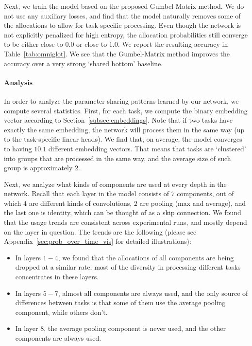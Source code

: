 \documentclass[conference]{IEEEtran}
\begin{document}
Next, we train the model based on the proposed Gumbel-Matrix method. We do not use any auxiliary losses, and find that the model naturally removes some of the allocations to allow for task-specific processing. Even though the network is not explicitly penalized for high entropy, the allocation probabilities still converge to be either close to $0.0$ or close to $1.0$. We report the resulting accuracy in Table~\ref{tab:omniglot}. We see that the Gumbel-Matrix method improves the accuracy over a very strong `shared bottom' baseline.

\paragraph{Analysis}

In order to analyze the parameter sharing patterns learned by our network, we compute several statistics. First, for each task, we compute the binary embedding vector according to Section~\ref{subsec:embeddings}. Note that if two tasks have exactly the same embedding, the network will process them in the same way (up to the task-specific linear heads). We find that, on average, the model converges to having $10.1$ different embedding vectors. That means that tasks are `clustered' into groups that are processed in the same way, and the average size of such group is approximately $2$.

Next, we analyze what kinds of components are used at every depth in the network. Recall that each layer in the model consists of $7$ components, out of which $4$ are different kinds of convolutions, $2$ are pooling (max and average), and the last one is identity, which can be thought of as a skip connection. We found that the usage trends are consistent across experimental runs, and mostly depend on the layer in question. The trends are the following (please see Appendix~\ref{sec:prob_over_time_vis} for detailed illustrations):
\begin{itemize}
    \item In layers $1-4$, we found that the allocations of all components are being dropped at a similar rate; most of the diversity in processing different tasks concentrates in these layers.
    \item In layers $5-7$, almost all components are always used, and the only source of differences between tasks is that some of them use the average pooling component, while others don't.
    \item In layer $8$, the average pooling component is never used, and the other components are always used.
\end{itemize}
\end{document}
